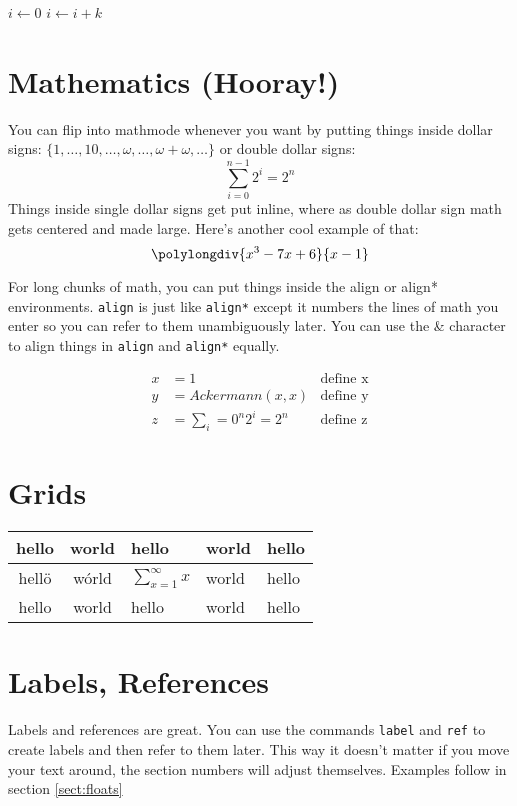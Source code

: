 \documentclass{article}
\begin{document}
\begin{algorithmic}
        \STATE $i\gets 0$
\ELSE
                \STATE $i\gets i+k$
        \ENDIF
\ENDIF
\end{algorithmic}

\section{Mathematics (Hooray!)}
You can flip into mathmode whenever you want by putting things inside dollar
signs: $\{1, \ldots, 10, \ldots, \omega, \ldots, \omega + \omega, \ldots \}$
or double dollar signs: $$\sum_{i=0}^{n-1} 2^i = 2^n$$ Things inside single
dollar signs get put inline, where as double dollar sign math gets centered
and made large. Here's another cool example of
that: $$\polylongdiv{x^3-7x+6}{x-1}$$

For long chunks of math, you can put things inside the align or align*
environments. \texttt{align} is just like \texttt{align*} except it numbers
the lines of math you enter so you can refer to them unambiguously later. You
can use the \& character to align things in \texttt{align} and \texttt{align*}
equally.

\begin{align}
  x &= 1 &\text{define x}\\
  y &= \mathit{Ackermann}(x,x) &\text{define y}\\
  z &= \sum_i=0^n 2^i = 2^n &\text{define z}
\end{align}

\section{Grids}
\begin{tabular}{c|c|lll}
  hello & world & hello & world & hello \\
  \hline
  \hline
  hell\"{o} & w\'{o}rld & $\sum_{x=1}^\infty x$ & world & hello \\
  hello & world & hello & world & hello \\
\end{tabular}

\section{Labels, References}

Labels and references are great. You can use the commands \texttt{label} and
\texttt{ref} to create labels and then refer to them later. This way it
doesn't matter if you move your text around, the section numbers will adjust
themselves. Examples follow in section \ref{sect:floats}
\end{document}
